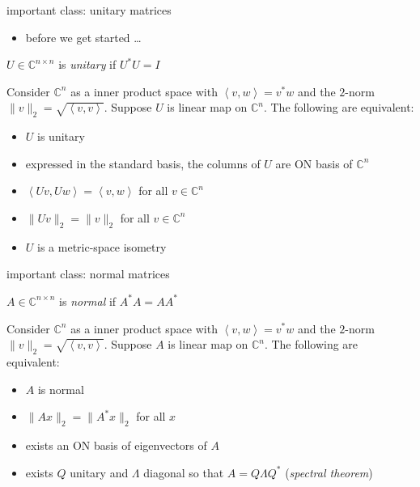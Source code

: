 \documentclass[10pt,hyperref]{beamer}
\newcommand{\CC}{\mathbb{C}}
\newcommand{\ip}[2]{\left<#1,#2\right>}
\begin{document}


\begin{frame}{important class: unitary matrices}

\begin{itemize}
\item before we get started \dots
\end{itemize}

\begin{definition}
$U \in \CC^{n\times n}$ is \emph{unitary} if $U^*U=I$
\end{definition}

\begin{lemma}
Consider $\CC^n$ as a inner product space with $\ip{v}{w}=v^*w$ and the $2$-norm $\|v\|_2 = \sqrt{\ip v v}$.  Suppose $U$ is linear map on $\CC^n$.  The following are equivalent:

\begin{itemize}
\item $U$ is unitary
\item expressed in the standard basis, the columns of $U$ are ON basis of $\CC^n$
\item $\ip{Uv}{Uw}=\ip{v}{w}$ for all $v\in\CC^n$
\item $\|Uv\|_2=\|v\|_2$ for all $v\in\CC^n$
\item $U$ is a metric-space isometry
\end{itemize}
\end{lemma}
\end{frame}


\begin{frame}{important class: normal matrices}

\begin{definition}
$A \in \CC^{n\times n}$ is \emph{normal} if $A^*A=AA^*$
\end{definition}

\begin{lemma}
Consider $\CC^n$ as a inner product space with $\ip{v}{w}=v^*w$ and the $2$-norm $\|v\|_2 = \sqrt{\ip v v}$.  Suppose $A$ is linear map on $\CC^n$.  The following are equivalent:

\begin{itemize}
\item $A$ is normal
\item $\|Ax\|_2 = \|A^*x\|_2$ for all $x$
\item exists an ON basis of eigenvectors of $A$
\item exists $Q$ unitary and $\Lambda$ diagonal so that $A=Q\Lambda Q^*$ (\emph{spectral theorem})
\end{itemize}
\end{lemma}
\end{frame}
\end{document}
